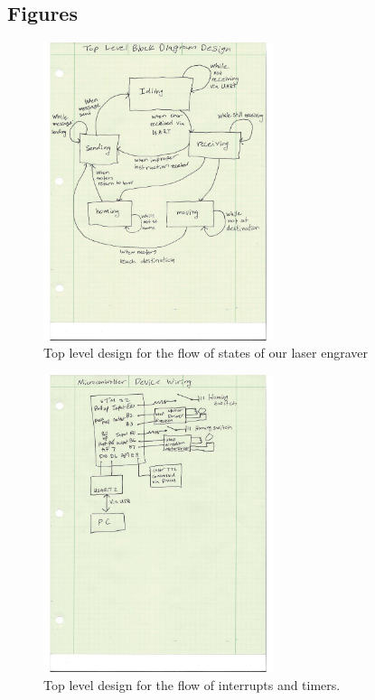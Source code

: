 \documentclass[11pt]{LaTeX-Classes/math-hw}
\begin{document}
\subsection{Figures}
 \begin{figure}[H]
   \begin{center}
     \includegraphics[width=0.6\textwidth]{blockdiagram}
     \caption{Top level design for the flow of states of our laser engraver}
     \label{fig:blockdiagram}
   \end{center}
 \end{figure}

\begin{figure}[H]
	   \begin{center}
	     \includegraphics[width=0.6\textwidth]{mcwiringdiagram}
	     \caption{Top level design for the flow of interrupts and timers.}
	     \label{fig:mcwiringdiagram}
	   \end{center}
	 \end{figure}
\end{document}
